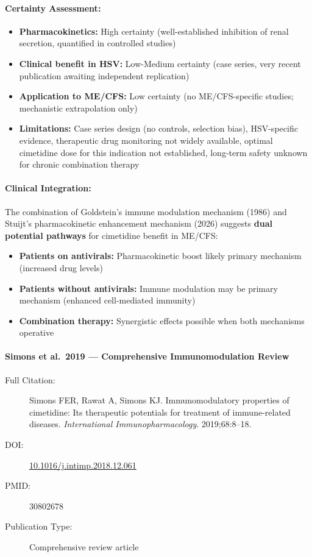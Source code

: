 \paragraph{Certainty Assessment:}
\begin{itemize}
    \item \textbf{Pharmacokinetics:} High certainty (well-established inhibition of renal secretion, quantified in controlled studies)
    \item \textbf{Clinical benefit in HSV:} Low-Medium certainty (case series, very recent publication awaiting independent replication)
    \item \textbf{Application to ME/CFS:} Low certainty (no ME/CFS-specific studies; mechanistic extrapolation only)
    \item \textbf{Limitations:} Case series design (no controls, selection bias), HSV-specific evidence, therapeutic drug monitoring not widely available, optimal cimetidine dose for this indication not established, long-term safety unknown for chronic combination therapy
\end{itemize}

\paragraph{Clinical Integration:}
The combination of Goldstein's immune modulation mechanism (1986) and Stuijt's pharmacokinetic enhancement mechanism (2026) suggests \textbf{dual potential pathways} for cimetidine benefit in ME/CFS:
\begin{itemize}
    \item \textbf{Patients on antivirals:} Pharmacokinetic boost likely primary mechanism (increased drug levels)
    \item \textbf{Patients without antivirals:} Immune modulation may be primary mechanism (enhanced cell-mediated immunity)
    \item \textbf{Combination therapy:} Synergistic effects possible when both mechanisms operative
\end{itemize}

\paragraph{Simons et al.\ 2019 --- Comprehensive Immunomodulation Review}

\begin{description}
    \item[Full Citation:] Simons FER, Rawat A, Simons KJ. Immunomodulatory properties of cimetidine: Its therapeutic potentials for treatment of immune-related diseases. \textit{International Immunopharmacology}. 2019;68:8--18.
    \item[DOI:] \href{https://doi.org/10.1016/j.intimp.2018.12.061}{10.1016/j.intimp.2018.12.061}
    \item[PMID:] 30802678
    \item[Publication Type:] Comprehensive review article
\end{description}

